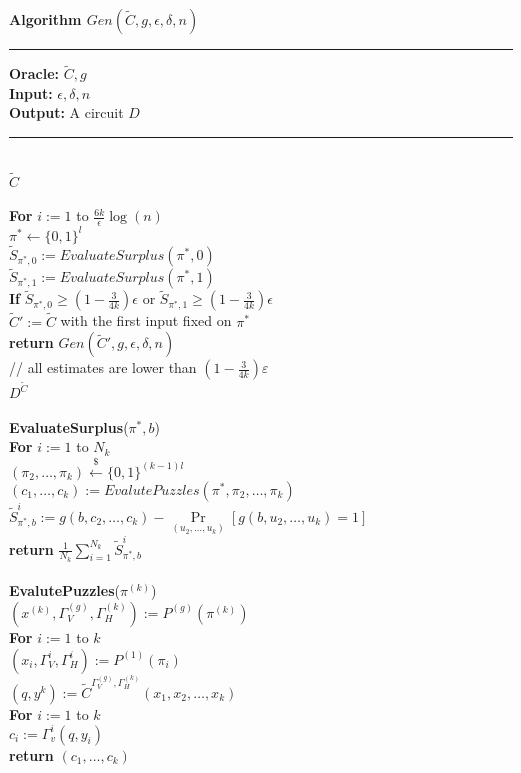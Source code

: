 \begin{codeblock}
  \textbf{Algorithm $Gen(\widetilde{C},g,\epsilon,\delta,n)$}
  \medskip

  \hrule

  \medskip

  \textbf{Oracle:} $\widetilde{C}, g$ \\
  \textbf{Input:}  $\epsilon, \delta, n$\\
  \textbf{Output:} A circuit $D$

  \medskip\hrule\medskip
  \If {} \then \\
  \IndI \return $\widetilde{C}$ \\ \\
  \textbf{For} $i:=1$ to $\frac{6k}{\epsilon}\log(n)$ \\
  \IndI $\pi^* \leftarrow \{0,1\}^{l}$\\
  \IndI $\widetilde{S}_{\pi^*,0} := EvaluateSurplus(\pi^*, 0)$\\
  \IndI $\widetilde{S}_{\pi^*,1} := EvaluateSurplus(\pi^*, 1)$\\
  \IndI \textbf{If} $\widetilde{S}_{\pi^*,0} \geq (1 - \frac{3}{4k}) \epsilon$ or $\widetilde{S}_{\pi^*,1} \geq (1 - \frac{3}{4k}) \epsilon$ \\
  \IndII $\widetilde{C}' := \widetilde{C}$ with the first input fixed on $\pi^*$\\
  \IndII\textbf{return} $Gen(\widetilde{C}', g, \epsilon, \delta, n)$ \\
  // all estimates are lower than $(1-\frac{3}{4k})\varepsilon$\\
  \return $D^{\widetilde{C}}$ \\
  \\
  \textbf{EvaluateSurplus}($\pi^*, b$) \\
  \IndI \textbf{For} $i:=1$ to $N_k$ \\
  \IndII $(\pi_2, \dots, \pi_k) \xleftarrow{\$} \{0,1\}^{(k-1)l}$\\
  \IndII $(c_1, \dots, c_k) := EvalutePuzzles(\pi^*, \pi_2, \dots, \pi_k)$\\
  \IndII $\widetilde{S}_{\pi^*,b}^i := g(b, c_2, \dots, c_k) - \underset{(u_2, \dots, u_k)}{\Pr}[g(b, u_2, \dots, u_k) = 1] $\\
  \IndI \textbf{return} $\frac{1}{N_k} \sum_{i=1}^{N_k} \widetilde{S}_{\pi^*,b}^i$\\
  \\
  \textbf{EvalutePuzzles}($\pi^{(k)}$)\\
  \IndI $(x^{(k)}, \Gamma_V^{(g)}, \Gamma_H^{(k)}) := P^{(g)}(\pi^{(k)})$ \\
  \IndI \textbf{For} $i:=1$ to $k$\\
  \IndII $(x_i, \Gamma_V^{i}, \Gamma_H^{i}) := P^{(1)}(\pi_i)$\\
  \IndI $(q,y^{k}) := \widetilde{C}^{\Gamma_V^{(g)}, \Gamma_H^{(k)}}(x_1, x_2, \dots, x_k)$\\
  \IndI \textbf{For} $i:=1$ to $k$\\
  \IndII $c_i := \Gamma_v^{i}(q, y_i)$\\
  \IndI \textbf{return} $(c_1, \dots, c_k)$\\
\end{codeblock}
